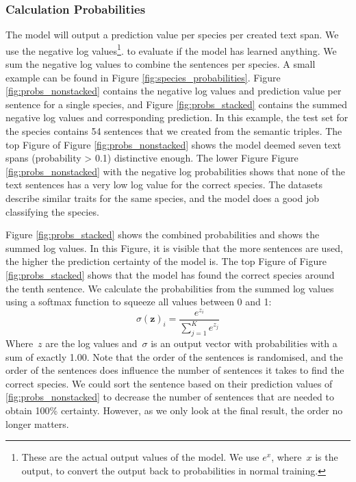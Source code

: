 \documentclass[a4paper, 12pt, oneside]{book} %
\begin{document}
\subsubsection{Calculation Probabilities}
The model will output a prediction value per species per created text span.
We use the negative log values\footnote{These are the actual output values of the model. We use \(e^{x}\), where~$x$ is the output, to convert the output back to probabilities in normal training. }. to evaluate if the model has learned anything. 
We sum the negative log values to combine the sentences per species. 
A small example can be found in Figure \ref{fig:species_probabilities}.
Figure \ref{fig:probs_nonstacked} contains the negative log values and prediction value per sentence for a single species, and Figure \ref{fig:probs_stacked} contains the summed negative log values and corresponding prediction.
In this example, the test set for the species contains 54 sentences that we created from the semantic triples.
The top Figure of Figure \ref{fig:probs_nonstacked} shows the model deemed seven text spans (probability > 0.1) distinctive enough.
The lower Figure Figure \ref{fig:probs_nonstacked} with the negative log probabilities shows that none of the text sentences has a very low log value for the correct species.
The datasets describe similar traits for the same species, and the model does a good job classifying the species.

Figure \ref{fig:probs_stacked} shows the combined probabilities and shows the summed log values.
In this Figure, it is visible that the more sentences are used, the higher the prediction certainty of the model is.
The top Figure of Figure \ref{fig:probs_stacked} shows that the model has found the correct species around the tenth sentence.
We calculate the probabilities from the summed log values using a softmax function to squeeze all values between 0 and 1:
\begin{equation} \label{eq:softmax}
    \sigma(\mathbf{z})_i = \frac{e^{z_i}}{\sum_{j=1}^K e^{z_j}}
\end{equation}
Where~$z$ are the log values and~$\sigma$ is an output vector with probabilities with a sum of exactly 1.00.
Note that the order of the sentences is randomised, and the order of the sentences does influence the number of sentences it takes to find the correct species.
We could sort the sentence based on their prediction values of \ref{fig:probs_nonstacked} to decrease the number of sentences that are needed to obtain 100\% certainty.
However, as we only look at the final result, the order no longer matters.
\end{document}

